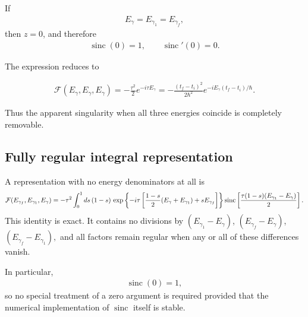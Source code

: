 If
\begin{align} E_\gamma=E_{\gamma_1}=E_{\gamma_f},
\end{align}
then $z=0$, and therefore
\begin{align}\operatorname{sinc}(0)=1, \qquad
  \operatorname{sinc}'(0)=0.
\end{align}

The expression reduces to
\begin{importantbox}
  \begin{align}
    \mathcal F(E_\gamma,E_\gamma,E_\gamma)
    =
    -\frac{\tau^2}{2}e^{-i\tau E_\gamma}
    =
    -\frac{(t_f-t_i)^2}{2\hbar^2}
    e^{-iE_\gamma(t_f-t_i)/\hbar}.
  \end{align}
\end{importantbox}
Thus the apparent singularity when all three energies coincide is
completely removable.

\subsection{Fully regular integral representation}
\begin{importantbox}
  A representation with no energy denominators at all is
  \begin{align}
    {\cal F}(E_{\gamma_f},E_{\gamma_1},E_\gamma)    =
    -\tau^2
    \int_0^1 ds\,
    (1-s)\,
    \exp\left\{
      -i\tau
      \left[
        \frac{1-s}{2}(E_\gamma+E_{\gamma_1})+sE_{\gamma_f}
      \right]
    \right\}
    \operatorname{sinc}
    \left[
      \frac{\tau(1-s)(E_{\gamma_1}-E_\gamma)}{2}
    \right].
  \end{align}
  This identity is exact. It contains no divisions by $ (E_{\gamma_1}-E_\gamma)$, $(E_{\gamma_f}-E_\gamma)$, $(E_{\gamma_f}-E_{\gamma_1}), $
  and all factors remain regular when any or all of these differences
  vanish.
\end{importantbox}
In particular,
\begin{align}\operatorname{sinc}(0)=1,
\end{align}
so no special treatment of a zero argument is required provided that the
numerical implementation of $\operatorname{sinc}$ itself is stable.
